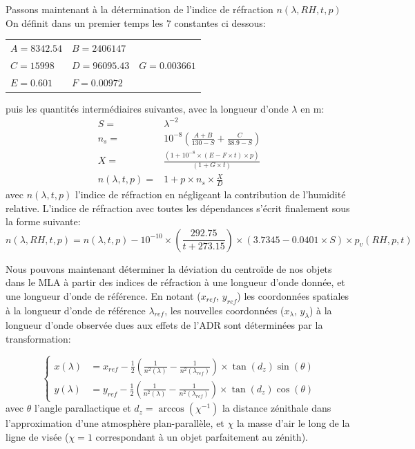\documentclass[../main/main.tex]{subfiles}
\begin{document}
Passons maintenant à la détermination de l'indice de réfraction $n(\lambda,RH,t,p)$
On définit dans un premier temps les $7$ constantes ci dessous:

\begin{center}
  \renewcommand{\arraystretch}{1.5}
\begin{tabular}{lll}
$A= 8342.54$ & $B = 2406147$ &\\
$C= 15998$ & $D = 96095.43$& $G = 0.003661$\\
$E = 0.601 $& $F = 0.00972$ &  \\
\end{tabular}
\end{center}
puis les quantités intermédiaires suivantes, avec la longueur
d'onde $\lambda$ en \textmu m:
\begin{align*}
    S =&  \lambda^{-2}\\
    n_s =& 10^{-8}\left(\frac{A + B}{130 - S} + \frac{C}{38.9 - S}\right)\\
    X =& \frac{\left(1 + 10^{-8} \times (E - F\times t) \times
         p\right)}{(1 + G \times t)}\\
    n(\lambda,t,p) =& 1 + p \times n_s \times \frac{X}{D}
\end{align*}
avec $n(\lambda,t,p)$ l'indice de réfraction en négligeant la contribution de
l'humidité relative. L'indice de réfraction avec toutes
les dépendances s'écrit finalement sous la forme suivante:
\begin{equation}
  \label{eq:refractindex}
    n(\lambda,RH,t,p) = n(\lambda,t,p) - 10^{-10}\times \left(\frac{292.75}{t + 273.15}\right) \times \left(3.7345 - 0.0401 \times S\right)\times p_v(RH,p,t)
\end{equation}

Nous pouvons maintenant déterminer la déviation du centroïde de nos
objets dans le MLA à partir des indices de réfraction à une longueur
d'onde donnée, et une longueur d'onde de référence.
En notant ($x_{ref}$, $y_{ref}$) les coordonnées spatiales à la longueur
d'onde de référence $\lambda_{ref}$, les nouvelles coordonnées ($x_{\lambda}$, $y_{\lambda}$) à
la longueur d'onde observée dues aux effets de l'ADR sont déterminées
par la transformation:

$$
  \left\{
    \begin{array}{ll}
    x(\lambda)&= x_{ref} - \frac{1}{2}\left( \frac{1}{n^{2}(\lambda)} - \frac{1}{n^{2}(\lambda_{ref})}\right)\times \tan(d_{z})\sin(\theta) \\
    y(\lambda)&= y_{ref} - \frac{1}{2}\left( \frac{1}{n^{2}(\lambda)} - \frac{1}{n^{2}(\lambda_{ref})}\right)\times \tan(d_{z})\cos(\theta)
    \end{array}
   \right.
$$
avec $\theta$ l'angle parallactique et $d_{z} = \arccos{\left(\chi^{-1}\right)}$ la
distance zénithale dans l'approximation d'une atmosphère plan-parallèle,
et $\chi$ la masse d'air le long de la ligne de visée ($\chi=1$
correspondant à un objet parfaitement au zénith).
\end{document}
